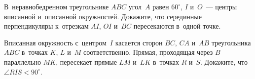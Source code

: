 \begin{problems}
\item
В~неравнобедренном треугольнике $ABC$ угол~$A$ равен $60^{\circ}$,
$I$ и~$O$~--- центры вписанной и~описанной окружностей.
Докажите, что серединные перпендикуляры к~отрезкам $AI$, $OI$ и~$BC$
пересекаются в~одной точке.

\item
Вписанная окружность с~центром~$I$ касается сторон $BC$, $CA$ и~$AB$
треугольника $ABC$ в~точках $K$, $L$ и~$M$ соответственно.
Прямая, проходящая через $B$ параллельно $MK$, пересекает прямые $LM$ и~$LK$
в~точках $R$ и~$S$.
Докажите, что $\angle RIS < 90^\circ$.

\end{problems}

